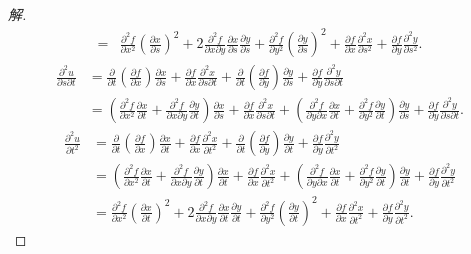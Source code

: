\begin{proof}[解]
\[\begin{aligned}
={}&\frac{\partial^{2}f}{\partial x^{2}}\left(\frac{\partial x}{\partial s}\right)^{2}+2\frac{\partial^{2}f}{\partial x\partial y}\frac{\partial x}{\partial s}\frac{\partial y}{\partial s}+\frac{\partial^{2}f}{\partial y^{2}}\left(\frac{\partial y}{\partial s}\right)^{2}+\frac{\partial f}{\partial x}\frac{\partial^{2}x}{\partial s^{2}}+\frac{\partial f}{\partial y}\frac{\partial^{2}y}{\partial s^{2}}.
\end{aligned}
\]
\[
\begin{aligned}
\frac{\partial^{2}u}{\partial s\partial t}&=\frac{\partial}{\partial t}\left(\frac{\partial f}{\partial x}\right)\frac{\partial x}{\partial s}+\frac{\partial f}{\partial x}\frac{\partial^{2}x}{\partial s\partial t}+\frac{\partial}{\partial t}\left(\frac{\partial f}{\partial y}\right)\frac{\partial y}{\partial s}+\frac{\partial f}{\partial y}\frac{\partial^{2}y}{\partial s\partial t}\\
&=\left(\frac{\partial^{2}f}{\partial x^{2}}\frac{\partial x}{\partial t}+\frac{\partial^{2}f}{\partial x\partial y}\frac{\partial y}{\partial t}\right)\frac{\partial x}{\partial s}+\frac{\partial f}{\partial x}\frac{\partial^{2}x}{\partial s\partial t}+\left(\frac{\partial^{2}f}{\partial y\partial x}\frac{\partial x}{\partial t}+\frac{\partial^{2}f}{\partial y^{2}}\frac{\partial y}{\partial t}\right)\frac{\partial y}{\partial s}+\frac{\partial f}{\partial y}\frac{\partial^{2}y}{\partial s\partial t}.
\end{aligned}
\]
\[
\begin{aligned}
\frac{\partial^{2}u}{\partial t^{2}}&=\frac{\partial}{\partial t}\left(\frac{\partial f}{\partial x}\right)\frac{\partial x}{\partial t}+\frac{\partial f}{\partial x}\frac{\partial^{2}x}{\partial t^{2}}+\frac{\partial}{\partial t}\left(\frac{\partial f}{\partial y}\right)\frac{\partial y}{\partial t}+\frac{\partial f}{\partial y}\frac{\partial^{2}y}{\partial t^{2}}\\
&=\left(\frac{\partial^{2}f}{\partial x^{2}}\frac{\partial x}{\partial t}+\frac{\partial^{2}f}{\partial x\partial y}\frac{\partial y}{\partial t}\right)\frac{\partial x}{\partial t}+\frac{\partial f}{\partial x}\frac{\partial^{2}x}{\partial t^{2}}+\left(\frac{\partial^{2}f}{\partial y\partial x}\frac{\partial x}{\partial t}+\frac{\partial^{2}f}{\partial y^{2}}\frac{\partial y}{\partial t}\right)\frac{\partial y}{\partial t}+\frac{\partial f}{\partial y}\frac{\partial^{2}y}{\partial t^{2}}\\
&=\frac{\partial^{2}f}{\partial x^{2}}\left(\frac{\partial x}{\partial t}\right)^{2}+2\frac{\partial^{2}f}{\partial x\partial y}\frac{\partial x}{\partial t}\frac{\partial y}{\partial t}+\frac{\partial^{2}f}{\partial y^{2}}\left(\frac{\partial y}{\partial t}\right)^{2}+\frac{\partial f}{\partial x}\frac{\partial^{2}x}{\partial t^{2}}+\frac{\partial f}{\partial y}\frac{\partial^{2}y}{\partial t^{2}}.
\end{aligned}
\]
\end{proof}

